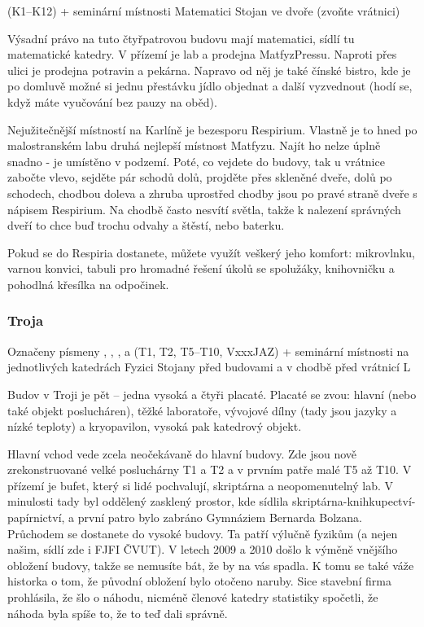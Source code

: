 { (K1--K12) + seminární místnosti}
{Matematici}
{Stojan ve dvoře (zvoňte vrátnici)}

Výsadní právo na tuto čtyřpatrovou budovu mají matematici, sídlí tu matematické katedry. V přízemí je lab a prodejna
MatfyzPressu. Naproti přes ulici je prodejna potravin a pekárna. Napravo od něj je také čínské bistro, kde je po domluvě
možné si jednu přestávku jídlo objednat a další vyzvednout (hodí se, když máte vyučování bez pauzy na oběd).

Nejužitečnější místností na Karlíně je bezesporu Respirium. Vlastně je to hned po malostranském labu druhá nejlepší
místnost Matfyzu. Najít ho nelze úplně snadno - je umístěno v podzemí. Poté, co vejdete do budovy, tak u vrátnice
zabočte vlevo, sejděte pár schodů dolů, projděte přes skleněné dveře, dolů po schodech, chodbou doleva a zhruba
uprostřed chodby jsou po pravé straně dveře s nápisem Respirium. Na chodbě často nesvítí světla, takže k nalezení
správných dveří to chce buď trochu odvahy a štěstí, nebo baterku.

Pokud se do Respiria dostanete, můžete využít veškerý jeho komfort: mikrovlnku, varnou konvici, tabuli pro hromadné
řešení úkolů se spolužáky, knihovničku a pohodlná křesílka na odpočinek.


\subsubsection{Troja}
{Označeny písmeny , , ,  a  (T1, T2, T5--T10, VxxxJAZ) + seminární místnosti na
jednotlivých katedrách}
{Fyzici}
{Stojany před budovami a v chodbě před vrátnicí L}

Budov v Troji je pět – jedna vysoká a čtyři placaté. Placaté se zvou: hlavní (nebo také objekt poslucháren), těžké
laboratoře, vývojové dílny (tady jsou jazyky a nízké teploty) a kryopavilon, vysoká pak katedrový objekt.

Hlavní vchod vede zcela neočekávaně do hlavní budovy. Zde jsou nově zrekonstruované velké posluchárny T1 a T2 a v prvním
patře malé T5 až T10. V přízemí je bufet, který si lidé pochvalují, skriptárna a neopomenutelný lab.
V minulosti tady byl oddělený zasklený prostor, kde sídlila skriptárna-knihkupectví-papírnictví, a první patro bylo
zabráno Gymnáziem Bernarda Bolzana.
Průchodem se dostanete do vysoké budovy. Ta patří výlučně fyzikům (a nejen našim, sídlí zde i FJFI ČVUT). V letech 2009
a 2010 došlo k výměně vnějšího obložení budovy, takže se nemusíte bát, že by na vás spadla. K tomu se také váže historka
o tom, že původní obložení bylo otočeno naruby. Sice stavební firma prohlásila, že šlo o náhodu, nicméně členové katedry
statistiky spočetli, že náhoda byla spíše to, že to teď dali správně.

